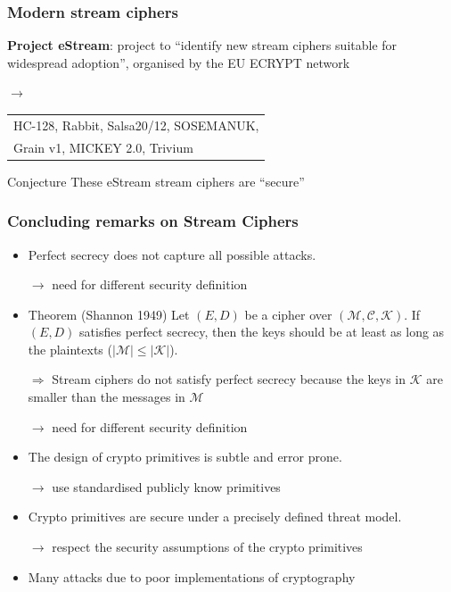 \documentclass[aspectratio=169, lualatex, 10pt,dvipsnames,svgnames]{beamer} %
\def\enrouge#1{\textcolor{rouge}{#1}}
\newcommand{\Ccal}{\mathcal{C}}
\newcommand{\Kcal}{\mathcal{K}}
\newcommand{\Mcal}{\mathcal{M}}
\begin{document}
\begin{frame}
  \frametitle{Modern stream ciphers}

  {\bf Project eStream}: project to ``identify new stream ciphers suitable for widespread adoption'', organised by the EU ECRYPT network

  $\longrightarrow$\begin{tabular}[t]{l}
    HC-128, Rabbit, Salsa20/12, SOSEMANUK, \\
    Grain v1, MICKEY 2.0, Trivium
  \end{tabular}
  \bigskip{}
  \pause

  \begin{block}{Conjecture}
    These eStream stream ciphers are ``secure''
  \end{block}

\end{frame}

\begin{frame}
  \frametitle{Concluding remarks on Stream Ciphers}
  \pause

  \begin{itemize}
  \item Perfect secrecy does not capture all possible attacks.
    
    \enrouge{$\longrightarrow$ need for different security definition}
    \medskip
    \pause

  \item Theorem (Shannon 1949) Let $(E, D)$ be a cipher over $(\Mcal, \Ccal, \Kcal)$. If $(E, D)$ satisfies perfect secrecy, then the keys should be at least as long as the plaintexts ($|\Mcal|\le |\Kcal| $).

    $\Rightarrow$ Stream ciphers do not satisfy perfect secrecy because the keys in $\Kcal$ are smaller than the messages in $\Mcal$

    \enrouge{$\longrightarrow$ need for different security definition}
    \medskip
    \pause

  \item The design of crypto primitives is subtle and error prone.

    \enrouge{$\longrightarrow$ use standardised publicly know primitives}
    \medskip
    \pause
    
  \item Crypto primitives are secure under a precisely defined threat model.

    \enrouge{$\longrightarrow$ respect the security assumptions of the crypto primitives}
    \medskip
    \pause

  \item Many attacks due to poor implementations of cryptography
  \end{itemize}

\end{frame}
\end{document}
